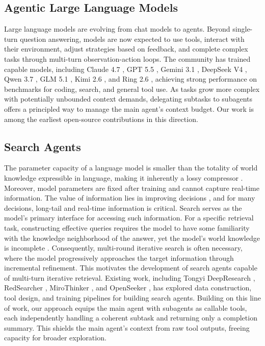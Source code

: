 \documentclass[table]{gtech}
\begin{document}
\subsection{Agentic Large Language Models}
Large language models are evolving from chat models to agents. Beyond single-turn question answering, models are now expected to use tools, interact with their environment, adjust strategies based on feedback, and complete complex tasks through multi-turn observation-action loops. The community has trained capable models, including Claude 4.7 \citep{anthropic2026claude47}, GPT 5.5 \citep{openai2026gpt55}, Gemini 3.1 \citep{google2026gemini31}, DeepSeek V4 \citep{deepseek2026v4}, Qwen 3.7 \citep{qwen2026qwen37}, GLM 5.1 \citep{glm2026glm51}, Kimi 2.6 \citep{kimi2026k26}, and Ring 2.6 \citep{inclusionai2026ring26}, achieving strong performance on benchmarks for coding, search, and general tool use. As tasks grow more complex with potentially unbounded context demands, delegating subtasks to subagents offers a principled way to manage the main agent's context budget. Our work is among the earliest open-source contributions in this direction.

\subsection{Search Agents}
The parameter capacity of a language model is smaller than the totality of world knowledge expressible in language, making it inherently a lossy compressor \citep{deletang2024language, allen2024physics}. Moreover, model parameters are fixed after training and cannot capture real-time information. The value of information lies in improving decisions \citep{howard1966information}, and for many decisions, long-tail and real-time information is critical. Search serves as the model's primary interface for accessing such information. For a specific retrieval task, constructing effective queries requires the model to have some familiarity with the knowledge neighborhood of the answer, yet the model's world knowledge is incomplete \citep{belkin1980anomalous}. Consequently, multi-round iterative search is often necessary, where the model progressively approaches the target information through incremental refinement. This motivates the development of search agents capable of multi-turn iterative retrieval. Existing work, including Tongyi DeepResearch \citep{team2025tongyi}, RedSearcher \citep{chu2026redsearcher}, MiroThinker \citep{team2026mirothinker}, and OpenSeeker \citep{du2026openseeker}, has explored data construction, tool design, and training pipelines for building search agents. Building on this line of work, our approach equips the main agent with subagents as callable tools, each independently handling a coherent subtask and returning only a completion summary. This shields the main agent's context from raw tool outputs, freeing capacity for broader exploration.
\end{document}
